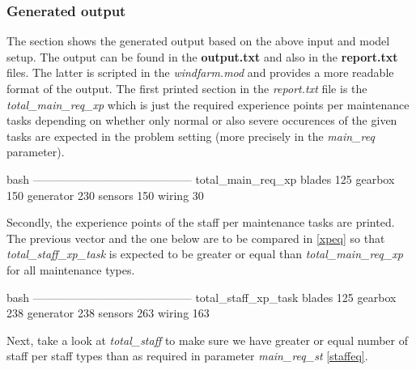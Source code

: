         \subsubsection{Generated output}
        The section shows the generated output based on the above input and model setup. The output 
        can be found in the \textbf{output.txt} and also in the \textbf{report.txt} files. The latter
        is scripted in the \textit{windfarm.mod} and provides a more readable format of the output.
        The first printed section in the \textit{report.txt} file is the \textit{total\_main\_req\_xp}
        which is just the required experience points per maintenance tasks depending on whether only
        normal or also severe occurences of the given tasks are expected in the problem setting (more
        precisely in the \textit{main\_req} parameter). \bigskip
        \newline
        \vspace{2pt}
        \begin{boxminted}{bash}
            ------------------------------------------
            total_main_req_xp
            blades 125
            gearbox 150
            generator 230
            sensors 150
            wiring 30
        \end{boxminted}
        \newline
        Secondly, the experience points of the staff per maintenance tasks are printed. 
        The previous vector and the one below are to be compared in 
        \eqref{xpeq} so that \textit{total\_staff\_xp\_task} is expected to be greater or equal 
        than \textit{total\_main\_req\_xp} for all maintenance types. \bigskip
        \newline
        \vspace{2pt}
        \begin{boxminted}{bash}
            ------------------------------------------
            total_staff_xp_task
            blades 125
            gearbox 238
            generator 238
            sensors 263
            wiring 163
        \end{boxminted}
        \newline
        Next, take a look at \textit{total\_staff} to make sure we have greater or equal number of 
        staff per staff types than as required in parameter \textit{main\_req\_st} \eqref{staffeq}.
        \bigskip
        \newline
        \vspace{2pt}
